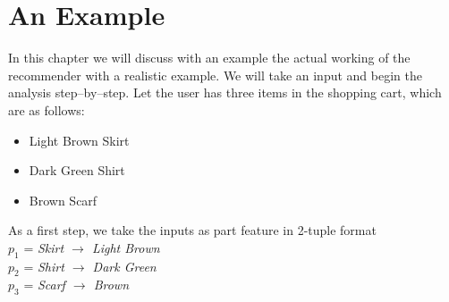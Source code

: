 \chapter{An Example}

In this chapter we will discuss with an example the actual working of the recommender with a realistic example. We will take an input and begin the analysis step--by--step. Let the user has three items in the shopping cart, which are as follows:
\begin{itemize}
\item Light Brown Skirt
\item Dark Green Shirt
\item Brown Scarf
\end{itemize}

As a first step, we take the inputs as part feature in 2-tuple format \\
$p_1$ = \textit{Skirt $\rightarrow$ Light Brown} \\
$p_2$ = \textit{Shirt $\rightarrow$ Dark Green} \\
$p_3$ = \textit{Scarf $\rightarrow$ Brown}\\

